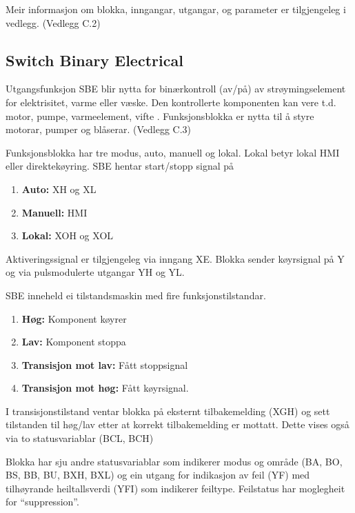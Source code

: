 Meir informasjon om blokka, inngangar, utgangar, og parameter er tilgjengeleg i vedlegg. (Vedlegg C.2)

\newpage

\subsection{Switch Binary Electrical} 

Utgangsfunksjon \gls{SBE} blir nytta for binærkontroll (av/på) av strøymingselement for elektrisitet, varme eller væske. 
Den kontrollerte komponenten kan vere t.d. motor, pumpe, varmeelement, vifte \citep{IEC-63131}. \newline
Funksjonsblokka er nytta til å styre motorar, pumper og blåserar. (Vedlegg C.3)

Funksjonsblokka har tre modus, auto, manuell og lokal. Lokal betyr lokal HMI eller direktekøyring.
\gls{SBE} hentar start/stopp signal på
\begin{enumerate}
    \item \textbf{Auto:}        XH og XL  
    \item \textbf{Manuell:}     HMI
    \item \textbf{Lokal:}       XOH og XOL
\end{enumerate}
Aktiveringssignal er tilgjengeleg via inngang XE. \newline
Blokka sender køyrsignal på Y og via pulsmodulerte utgangar YH og YL.

\gls{SBE} inneheld ei tilstandsmaskin med fire funksjonstilstandar. 
\begin{enumerate}
    \item \textbf{Høg:}                 Komponent køyrer
    \item \textbf{Lav:}                 Komponent stoppa
    \item \textbf{Transisjon mot lav:}  Fått stoppsignal
    \item \textbf{Transisjon mot høg:}  Fått køyrsignal.
\end{enumerate}

I transisjonstilstand ventar blokka på eksternt tilbakemelding (XGH) 
og sett tilstanden til høg/lav etter at korrekt tilbakemelding er mottatt.
Dette vises også via to statusvariablar (BCL, BCH)

Blokka har sju andre statusvariablar som indikerer modus og område (BA, BO, BS, BB, BU, BXH, BXL) og
ein utgang for indikasjon av feil (YF) med tilhøyrande heiltallsverdi (YFI) som indikerer feiltype. \newline
Feilstatus har moglegheit for ``suppression''.

